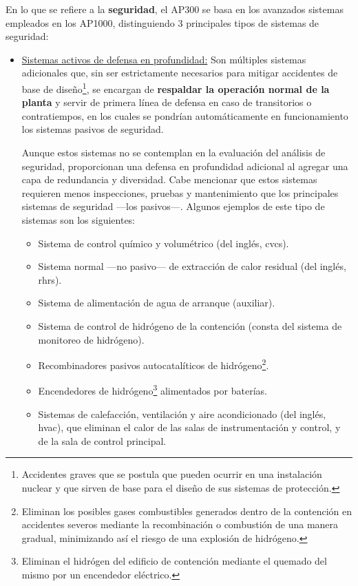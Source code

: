 En lo que se refiere a la \textbf{seguridad}, el AP300 se basa en los avanzados sistemas empleados en los AP1000, distinguiendo 3 principales tipos de sistemas de seguridad:

\begin{itemize}
  \item \underline{Sistemas activos de defensa en profundidad:} Son múltiples sistemas adicionales que, sin ser estrictamente necesarios para mitigar accidentes de base de diseño\footnote{Accidentes graves que se postula que pueden ocurrir en una instalación nuclear y que sirven de base para el diseño de sus sistemas de protección.}, se encargan de \textbf{respaldar la operación normal de la planta} y servir de primera línea de defensa en caso de transitorios o contratiempos, en los cuales se pondrían automáticamente en funcionamiento los sistemas pasivos de seguridad. 
  
  Aunque estos sistemas no se contemplan en la evaluación del análisis de seguridad, proporcionan una defensa en profundidad adicional al agregar una capa de redundancia y diversidad. Cabe mencionar que estos sistemas requieren menos inspecciones, pruebas y mantenimiento que los principales sistemas de seguridad ---los pasivos---. Algunos ejemplos de este tipo de sistemas son los siguientes:

  \begin{itemize}
    \item Sistema de control químico y volumétrico (del inglés, \acrshort{cvcs}).
    \item Sistema normal ---no pasivo--- de extracción de calor residual (del inglés, \acrshort{rhrs}).
    \item Sistema de alimentación de agua de arranque (auxiliar).
    \item Sistema de control de hidrógeno de la contención (consta del sistema de monitoreo de hidrógeno).
    \item R\gls{ecombinadores pasivos} autocatalíticos de hidrógeno\footnote{Eliminan los posibles gases combustibles generados dentro de la contención en accidentes severos mediante la recombinación o combustión de una manera gradual, minimizando así el riesgo de una explosión de hidrógeno.}.
    \item Encendedores de hidrógeno\footnote{Eliminan el hidrógen del edificio de contención mediante el quemado del mismo por un encendedor eléctrico.} alimentados por baterías.
    \item Sistemas de calefacción, ventilación y aire acondicionado (del inglés, \acrshort{hvac}), que eliminan el calor de las salas de instrumentación y control, y de la sala de control principal.
  \end{itemize}


\end{itemize}
